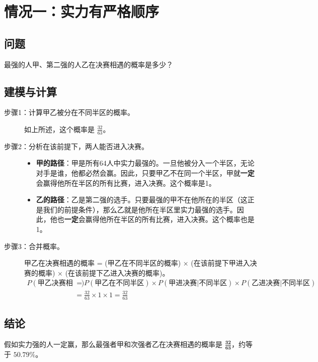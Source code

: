 \documentclass{article}
\begin{document}
\section{情况一：实力有严格顺序}
\subsection*{问题}
最强的人甲、第二强的人乙在决赛相遇的概率是多少？

\subsection*{建模与计算}
\begin{description}
    \item[步骤1：计算甲乙被分在不同半区的概率。]
    如上所述，这个概率是 $\frac{32}{63}$。
    
    \item[步骤2：分析在该前提下，两人能否进入决赛。]
    \begin{itemize}
        \item \textbf{甲的路径}：甲是所有64人中实力最强的。一旦他被分入一个半区，无论对手是谁，他都必然会赢。因此，只要甲乙不在同一个半区，甲就\textbf{一定}会赢得他所在半区的所有比赛，进入决赛。这个概率是1。
        \item \textbf{乙的路径}：乙是第二强的选手。只要最强的甲不在他所在的半区（这正是我们的前提条件），那么乙就是他所在半区里实力最强的选手。因此，他也\textbf{一定}会赢得他所在半区的所有比赛，进入决赛。这个概率也是1。
    \end{itemize}
    
    \item[步骤3：合并概率。]
    甲乙在决赛相遇的概率 = (甲乙在不同半区的概率) × (在该前提下甲进入决赛的概率) × (在该前提下乙进入决赛的概率)。
    \begin{align*}
        P(\text{甲乙决赛相遇}) &= P(\text{甲乙在不同半区}) \times P(\text{甲进决赛} | \text{不同半区}) \times P(\text{乙进决赛} | \text{不同半区}) \\
        &= \frac{32}{63} \times 1 \times 1 = \frac{32}{63}
    \end{align*}
\end{description}

\subsection*{结论}
假如实力强的人一定赢，那么最强者甲和次强者乙在决赛相遇的概率是 $\mathbf{\frac{32}{63}}$，约等于 $50.79\%$。
\end{document}
